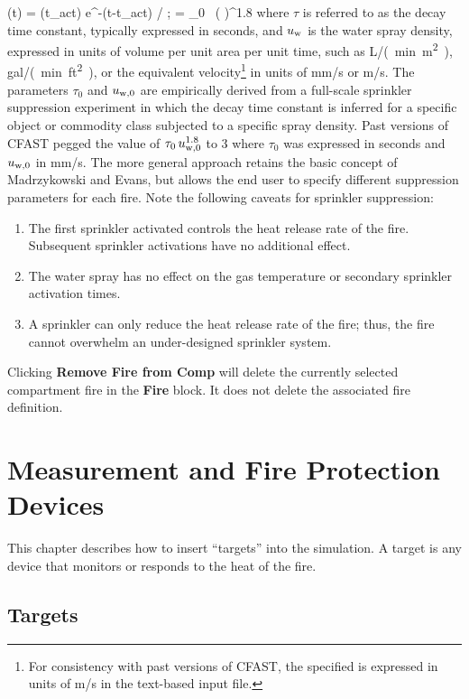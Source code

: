 {{\be
   \dQ(t) = \dQ(t_{\rm act}) \; {\rm e}^{-(t-t_{\rm act}) /\tau}   \quad ; \quad \tau = \tau_0 \, \left(  \right)^{1.8}
\ee
where $\tau$ is referred to as the decay time constant, typically expressed in seconds, and $u_{\rm w}$ is the water spray density, expressed in units of volume per unit area per unit time, such as \unit{L/(min.m^2)}, \unit{gal/(min.ft^2)}, or the equivalent velocity\footnote{For consistency with past versions of CFAST, the specified  is expressed in units of m/s in the text-based input file.} in units of mm/s or m/s. The parameters $\tau_0$ and $u_{\rm w,0}$ are empirically derived from a full-scale sprinkler suppression experiment in which the decay time constant is inferred for a specific object or commodity class subjected to a specific spray density. Past versions of CFAST pegged the value of $\tau_0 \, u_{\rm w,0}^{1.8}$ to 3 where  $\tau_0$ was expressed in seconds and $u_{\rm w,0}$ in mm/s. The more general approach retains the basic concept of Madrzykowski and Evans, but allows the end user to specify different suppression parameters for each fire. Note the following caveats for sprinkler suppression:
\begin{enumerate}
\item The first sprinkler activated controls the heat release rate of the fire. Subsequent sprinkler activations have no additional effect.
\item The water spray has no effect on the gas temperature or secondary sprinkler activation times.
\item A sprinkler can only reduce the heat release rate of the fire; thus, the fire cannot overwhelm an under-designed sprinkler system.
\end{enumerate}

Clicking \textbf{Remove Fire from Comp} will delete the currently selected compartment fire in the \textbf{Fire} block. It does not delete the associated fire definition.

\chapter{Measurement and Fire Protection Devices}
\label{info:DEVC}

This chapter describes how to insert ``targets'' into the simulation. A target is any device that monitors or responds to the heat of the fire.


\section{Targets}
\label{chapter:targets}

}}
